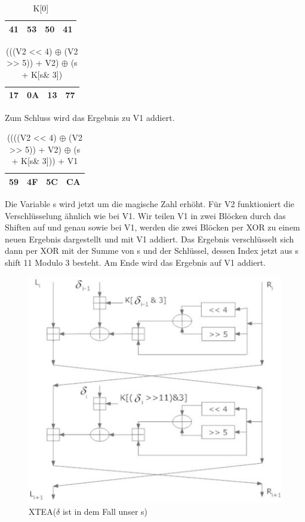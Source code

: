 \documentclass[course=asp]{aspdoc}
\begin{document}
\begin{table}[H]
\centering 
    \begin{tabular}{|l|l|l|l|}
        \hline
        41 & 53 & 50 & 41    \\
        \hline
    \end{tabular}
    \caption{K[0]}
\end{table}

\begin{table}[H]
\centering 
    \begin{tabular}{|l|l|l|l|}
        \hline
        17 & 0A & 13 & 77    \\
        \hline
    \end{tabular}
    \caption{(((V2 << 4) $\oplus$ (V2 >> 5)) + V2) $\oplus$ (s + K[s\& 3])}
\end{table}
Zum Schluss wird das Ergebnis zu V1 addiert.

\begin{table}[H]
\centering 
    \begin{tabular}{|l|l|l|l|}
        \hline
        59 & 4F & 5C & CA    \\
        \hline
    \end{tabular}
    \caption{((((V2 << 4) $\oplus$ (V2 >> 5)) + V2) $\oplus$ (s + K[s\& 3])) + V1}
\end{table}



Die Variable s wird jetzt um die magische Zahl erhöht. Für V2 funktioniert die Verschlüsselung ähnlich wie bei V1. Wir teilen V1 in zwei Blöcken durch das Shiften auf und genau sowie bei V1, werden die zwei Blöcken per XOR zu einem neuen Ergebnis dargestellt und mit V1 addiert. Das Ergebnis verschlüsselt sich dann per XOR mit der Summe von s und der Schlüssel, dessen Index jetzt aus s shift 11 Modulo 3 besteht. Am Ende wird das Ergebnis auf V1 addiert.
\begin{figure}[h]
\centering
\includegraphics[scale = 0.55]{XTEA.png}
\caption{XTEA(${\delta}$ ist in dem Fall unser s)}
\end{figure}
\newpage
\end{document}

